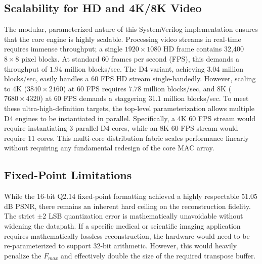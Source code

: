 \subsection{Scalability for HD and 4K/8K Video}
The modular, parameterized nature of this SystemVerilog implementation ensures that the core engine is highly scalable. Processing video streams in real-time requires immense throughput; a single $1920 \times 1080$ HD frame contains 32,400 $8 \times 8$ pixel blocks. At standard 60 frames per second (FPS), this demands a throughput of $1.94$ million blocks/sec. The D4 variant, achieving 3.04 million blocks/sec, easily handles a 60 FPS HD stream single-handedly. However, scaling to 4K ($3840 \times 2160$) at 60 FPS requires $7.78$ million blocks/sec, and 8K ($7680 \times 4320$) at 60 FPS demands a staggering $31.1$ million blocks/sec. To meet these ultra-high-definition targets, the top-level parameterization allows multiple D4 engines to be instantiated in parallel. Specifically, a 4K 60 FPS stream would require instantiating 3 parallel D4 cores, while an 8K 60 FPS stream would require 11 cores. This multi-core distribution fabric scales performance linearly without requiring any fundamental redesign of the core MAC array.

\subsection{Fixed-Point Limitations}
While the 16-bit Q2.14 fixed-point formatting achieved a highly respectable 51.05 dB PSNR, there remains an inherent hard ceiling on the reconstruction fidelity. The strict $\pm 2$ LSB quantization error is mathematically unavoidable without widening the datapath. If a specific medical or scientific imaging application requires mathematically lossless reconstruction, the hardware would need to be re-parameterized to support 32-bit arithmetic. However, this would heavily penalize the $F_{max}$ and effectively double the size of the required transpose buffer.
